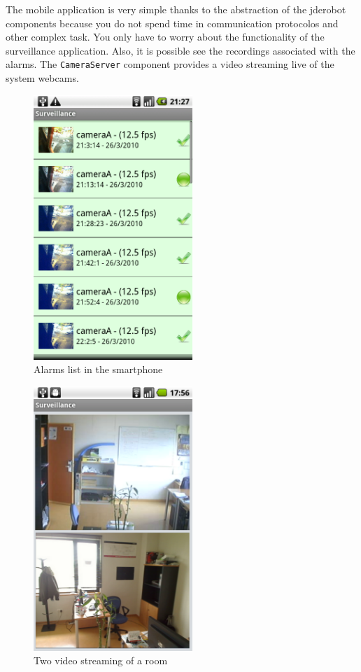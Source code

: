 \documentclass[twocolumn]{svjour3}          %
\begin{document}
The mobile application is very simple thanks to the abstraction of the
jderobot components because you do not spend time in communication
protocolos and other complex task. You only have to worry about the
functionality of the surveillance application. 
Also, it is possible see the recordings associated with the alarms. The \texttt{CameraServer} component provides a video streaming live of the system webcams.


\begin{figure}
\includegraphics[width=6cm]{figs/surveillance-android.png}
\caption{Alarms list in the smartphone}
\label{fig:surveillance2}
\end{figure}

\begin{figure}
\includegraphics[width=6cm]{figs/surveillance-streaming2-recording.png}
\caption{Two video streaming of a room}
\label{fig:surveillance3}
\end{figure}
\end{document}
